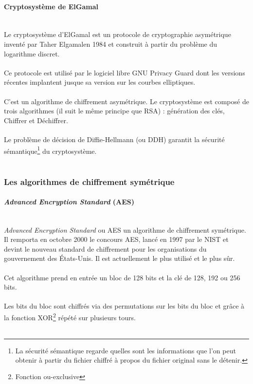            \paragraph*{Cryptosystème de ElGamal} \hspace{0pt} \\
                Le cryptosystème d'ElGamal est un protocole de cryptographie asymétrique inventé par Taher Elgamalen 1984 et construit à partir du problème du logarithme discret. \\ \\
                Ce protocole est utilisé par le logiciel libre GNU Privacy Guard dont les versions récentes implantent jusque sa version sur les courbes elliptiques.  \\ \\
                C’est un algorithme de chiffrement asymétrique. Le cryptosystème est composé de trois algorithmes (il suit le même principe que RSA) : génération des clés, Chiffrer et Déchiffrer. \\ \\
                Le problème de décision de Diffie-Hellmann (ou DDH) garantit la sécurité sémantique\footnote{La sécurité sémantique regarde quelles sont les informations que l'on peut obtenir à partir du fichier chiffré à propos du fichier original sans le détenir.} du cryptosystème. \\ \\
            
        \subsubsection*{Les algorithmes de chiffrement symétrique}
        
            \paragraph*{\textit{Advanced Encryption Standard} (AES)} \hspace{0pt} \\
                \textit{Advanced Encryption Standard} ou AES un algorithme de chiffrement symétrique. Il remporta en octobre 2000 le concours AES, lancé en 1997 par le NIST et devint le nouveau standard de chiffrement pour les organisations du gouvernement des États-Unis. Il est actuellement le plus utilisé et le plus sûr. \\ \\
                Cet algorithme prend en entrée un bloc de 128 bits et la clé de 128, 192 ou 256 bits. \\ \\
                Les bits du bloc sont chiffrés via des permutations sur les bits du bloc et grâce à la fonction XOR\footnote{Fonction ou-exclusive} répété sur plusieurs tours. \\ \\
        
